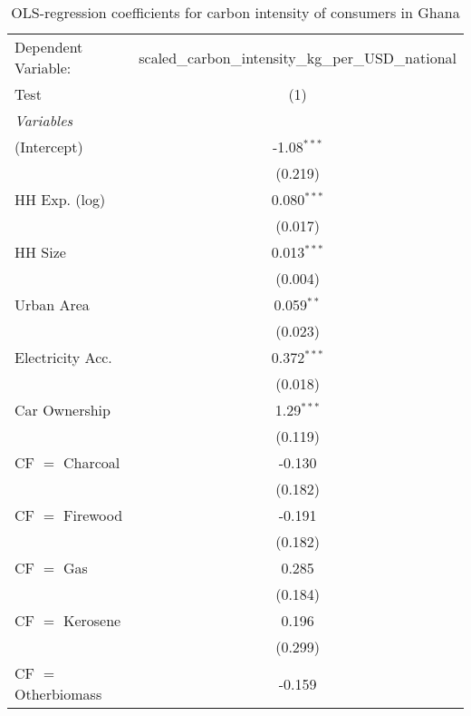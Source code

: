 
\begin{table}[htbp!]
   \centering
   \small
   \begin{adjustbox}{width = 1\textwidth, max height = 0.95\textheight, center}
      \begin{threeparttable}[b]
         \caption{\label{tab:OLS_1_GHA} OLS-regression coefficients for carbon intensity of consumers in Ghana}
         \begin{tabular}{lc}
            \tabularnewline \midrule \midrule
            Dependent Variable: & scaled\_carbon\_intensity\_kg\_per\_USD\_national\\        
            Test                & (1)\\  
            \midrule
            \emph{Variables}\\
            (Intercept)         & -1.08$^{***}$\\   
                                & (0.219)\\   
            HH Exp. (log)       & 0.080$^{***}$\\   
                                & (0.017)\\   
            HH Size             & 0.013$^{***}$\\   
                                & (0.004)\\   
            Urban Area          & 0.059$^{**}$\\   
                                & (0.023)\\   
            Electricity Acc.    & 0.372$^{***}$\\   
                                & (0.018)\\   
            Car Ownership       & 1.29$^{***}$\\   
                                & (0.119)\\   
            CF $=$ Charcoal     & -0.130\\   
                                & (0.182)\\   
            CF $=$ Firewood     & -0.191\\   
                                & (0.182)\\   
            CF $=$ Gas          & 0.285\\   
                                & (0.184)\\   
            CF $=$ Kerosene     & 0.196\\   
                                & (0.299)\\   
            CF $=$ Otherbiomass & -0.159\\   

\end{tabular}
\end{threeparttable}
\end{adjustbox}
\end{table}

